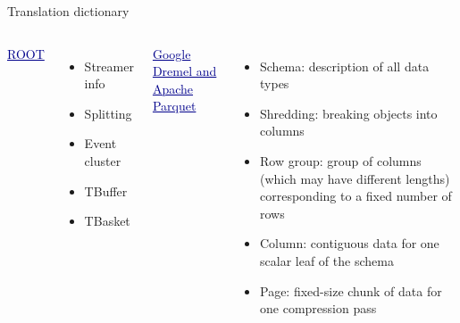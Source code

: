\documentclass{beamer}
\begin{document}
\begin{frame}{Translation dictionary}
\vspace{0.5 cm}
\begin{columns}[t]
\textcolor{darkblue}{\underline{\large ROOT}}

\vspace{0.2 cm}
\begin{itemize}\setlength{\itemsep}{0.2 cm}
\item Streamer info
\item Splitting
\item Event cluster

\vspace{2\baselineskip}

\item TBuffer

\vspace{\baselineskip}

\item TBasket
\end{itemize}

\textcolor{darkblue}{\underline{\large Google Dremel and Apache Parquet}}

\vspace{0.2 cm}
\begin{itemize}\setlength{\itemsep}{0.2 cm}
\item Schema: description of all data types
\item Shredding: breaking objects into columns
\item Row group: group of columns (which may have different lengths) corresponding to a fixed number of rows
\item Column: contiguous data for one scalar leaf of the schema
\item Page: fixed-size chunk of data for one compression pass
\end{itemize}
\end{columns}
\end{frame}
\end{document}
